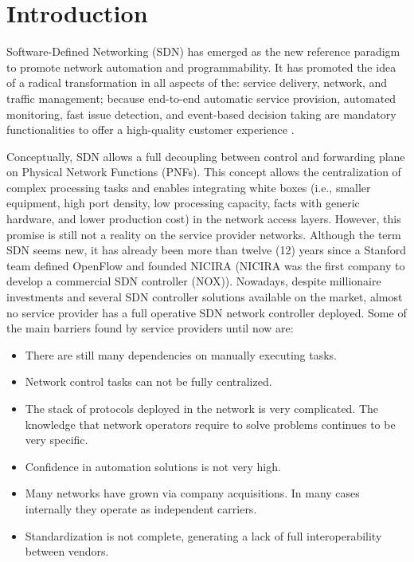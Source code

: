 \documentclass[10pt, conference]{IEEEtran}
\begin{document}
\section{Introduction}
Software-Defined Networking (SDN) has emerged as the new reference paradigm to promote network automation and programmability. It has promoted the idea of a radical transformation in all aspects of the: service delivery, network, and traffic management; because end-to-end automatic service provision, automated monitoring, fast issue detection, and event-based decision taking are mandatory functionalities to offer a high-quality customer experience \cite{ordonez2017network}.

Conceptually, SDN allows a full decoupling between control and forwarding plane on Physical Network Functions (PNFs). 
This concept allows the centralization of complex processing tasks and enables integrating white boxes (i.e., smaller equipment, high port density, low processing capacity, facts with generic hardware, and lower production cost) in the network access layers. However, this promise is still not a reality on the service provider networks. Although the term SDN seems new, it has already been more than twelve (12) years since a Stanford team defined OpenFlow and founded NICIRA (NICIRA was the first company to develop a commercial SDN controller (NOX)). Nowadays, despite millionaire investments and several SDN controller solutions available \cite{medved2014opendaylight,berde2014onos} on the market, almost no service provider has a full operative SDN network controller deployed. Some of the main barriers found by service providers until now are:

\begin{itemize}
    \item There are still many dependencies on manually executing tasks.
    \item Network control tasks can not be fully centralized.
    \item The stack of protocols deployed in the network is very complicated.  The knowledge that network operators require to solve problems continues to be very specific.
    \item Confidence in automation solutions is not very high.
    \item Many networks have grown via company acquisitions. In many cases internally they operate as independent carriers. 
    \item Standardization is not complete, generating a lack of full interoperability between vendors.
\end{itemize}
\end{document}
